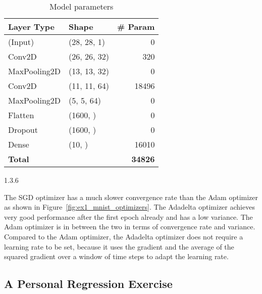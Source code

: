 \begin{table}[ht!]
  \begin{tabular}{|l|l|r|}
    \hline
    \textbf{Layer Type} & \textbf{Shape} & \textbf{\# Param} \\ \hline
    (Input)             & (28, 28, 1)    & 0                 \\ \hline
    Conv2D              & (26, 26, 32)   & 320               \\ \hline
    MaxPooling2D        & (13, 13, 32)   & 0                 \\ \hline
    Conv2D              & (11, 11, 64)   & 18496             \\ \hline
    MaxPooling2D        & (5, 5, 64)     & 0                 \\ \hline
    Flatten             & (1600, )       & 0                 \\ \hline
    Dropout             & (1600, )       & 0                 \\ \hline
    Dense               & (10, )         & 16010             \\ \hline\hline
    \textbf{Total}      &                & \textbf{34826}    \\ \hline
  \end{tabular}
  \centering
  \caption{Model parameters}
  \label{tab:ex1_model}
\end{table}


\begin{task}{1.3.6}
\end{task}

The SGD optimizer has a much slower convergence rate than the Adam optimizer as shown in
Figure~\ref{fig:ex1_mnist_optimizers}. The Adadelta optimizer achieves very good performance after
the first epoch already and has a low variance. The Adam optimizer is in between the two in
terms of convergence rate and variance. Compared to the Adam optimizer, the Adadelta optimizer
does not require a learning rate to be set, because it uses the gradient and the average of
the squared gradient over a window of time steps to adapt the learning rate.



\subsection{A Personal Regression Exercise}
\label{ex:1.4}

